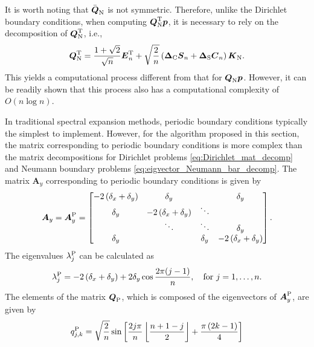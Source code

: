 \documentclass[preprint]{elsarticle}
\begin{document}
It is worth noting that $\bar{\boldsymbol{Q}}_{\rm N}$ is not symmetric. Therefore, unlike the Dirichlet boundary conditions, when computing $\boldsymbol{Q}_{\rm N}^{\rm T}\boldsymbol{p}$, it is necessary to rely on the decomposition of $\boldsymbol{Q}_{\rm N}^{\rm T}$, i.e.,
\begin{equation}
    \label{eq:eigvector_Neumann_bar_transpose_decomp}
    \boldsymbol{Q}_{\rm N}^{\rm T}=\frac{1+\sqrt{2}}{\sqrt{n}}\boldsymbol{E}_n^{\rm T}+\sqrt{\frac{2}{n}}\left(\boldsymbol{\Delta}_{\rm C}\boldsymbol{S}_{n}+\boldsymbol{\Delta}_{\rm S}\boldsymbol{C}_{n}\right)\boldsymbol{K}_{\rm N}.
\end{equation}
This yields a computational process different from that for $\boldsymbol{Q}_{\rm N}\boldsymbol{p}$. However, it can be readily shown that this process also has a computational complexity of $O\left(n\log n\right)$.\par
In traditional spectral expansion methods, periodic boundary conditions typically the simplest to implement. However, for the algorithm proposed in this section, the matrix corresponding to periodic boundary conditions is more complex than the matrix decompositions for Dirichlet problems \eqref{eq:Dirichlet_mat_decomp} and Neumann boundary problems \eqref{eq:eigvector_Neumann_bar_decomp}. The matrix $\boldsymbol{A}_y$ corresponding to periodic boundary conditions is given by
\begin{equation}
    \label{eq:submat_Periodic}
    \boldsymbol{A}_y=\boldsymbol{A}_y^{\rm P}=
    \left[\begin{matrix}
        -2\left(\delta_x+\delta_y\right) & \delta_y &  & \delta_y\\
        \delta_y & -2\left(\delta_x+\delta_y\right) & \ddots\\
        & \ddots & \ddots & \delta_y\\
        \delta_y & & \delta_y & -2\left(\delta_x+\delta_y\right)
    \end{matrix}\right].
\end{equation}
The eigenvalues ${\lambda}^{\rm P}_{j}$ can be calculated as
\begin{equation}
    \label{eq:eigenvalues_Periodic_corrected}
    \lambda_j^{\rm P}=-2\left(\delta_x+\delta_y\right)+2\delta_y\cos\frac{2\pi(j-1)}{n}, \quad \text{for } j=1, \dots, n.
\end{equation}
The elements of the matrix $\boldsymbol{Q}_{\rm P}$, which is composed of the eigenvectors of $\boldsymbol{A}_y^{\rm P}$, are given by
\begin{equation}
    \label{eq:Q_periodic_elements}
    q_{j,k}^{\rm P}=\sqrt{\frac{2}{n}}\sin\left[\frac{2j\pi}{n}\left\lfloor\frac{n+1-j}{2}\right\rfloor+\frac{\pi\left(2k-1\right)}{4}\right]
\end{equation}
\end{document}
